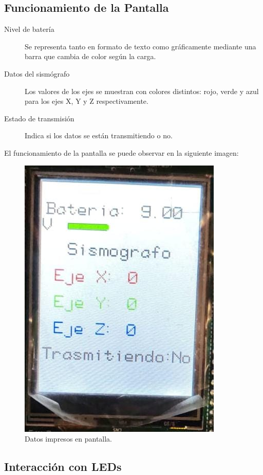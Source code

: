 \subsection*{Funcionamiento de la Pantalla}

\begin{description}
    \item[Nivel de batería] Se representa tanto en formato de texto como gráficamente mediante una barra que cambia de color según la carga.
    \item[Datos del sismógrafo] Los valores de los ejes se muestran con colores distintos: rojo, verde y azul para los ejes X, Y y Z respectivamente.
    \item[Estado de transmisión] Indica si los datos se están transmitiendo o no.
\end{description}
El funcionamiento de la pantalla se puede observar en la siguiente imagen:
\begin{figure}[H]
    \centering
    \includegraphics[scale=0.25]{images/pantalla.jpeg}
    \caption{Datos impresos en pantalla.}
    \label{fig:pantalla}
\end{figure}

\subsection*{Interacción con LEDs}

